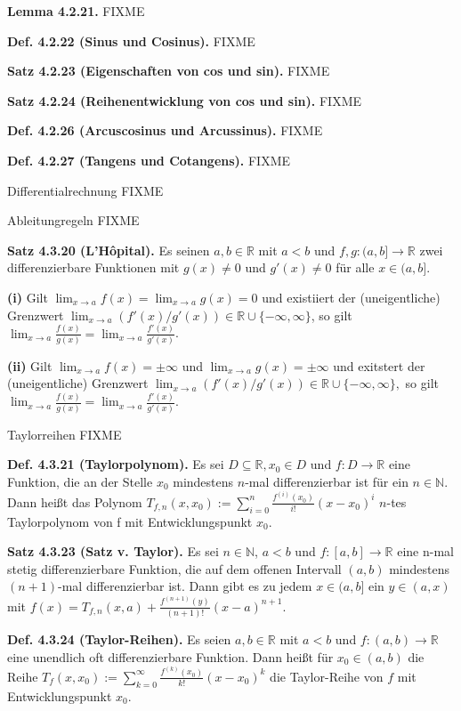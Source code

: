 \documentclass[ngerman]{article}
\begin{document}
\begin{multicols}{4}
\begin{tiny}
\textbf{Lemma 4.2.21.} FIXME

\textbf{Def. 4.2.22 (Sinus und Cosinus).} FIXME

\textbf{Satz 4.2.23 (Eigenschaften von cos und sin).} FIXME

\textbf{Satz 4.2.24 (Reihenentwicklung von cos und sin).} FIXME

\textbf{Def. 4.2.26 (Arcuscosinus und Arcussinus).} FIXME

\textbf{Def. 4.2.27 (Tangens und Cotangens).} FIXME

Differentialrechnung FIXME



Ableitungregeln FIXME



\textbf{Satz 4.3.20 (L'Hôpital).} Es seinen $a,b\in\mathbb{R}$ mit
$a<b$ und $f,g:(a,b]\rightarrow\mathbb{R}$ zwei differenzierbare
Funktionen mit $g(x)\not=0$ und $g'(x)\not=0$ für alle $x\in(a,b]$.

\textbf{(i)} Gilt $\lim_{x\rightarrow a}f(x)=\lim_{x\rightarrow a}g(x)=0$
und existiiert der (uneigentliche) Grenzwert $\lim_{x\rightarrow a}(f'(x)/g'(x))\in\mathbb{R}\cup\{-\infty,\infty\}$,
so gilt $\lim_{x\rightarrow a}\frac{f(x)}{g(x)}=\lim_{x\rightarrow a}\frac{f'(x)}{g'(x)}$.

\textbf{(ii) }Gilt $\lim_{x\rightarrow a}f(x)=\pm\infty$ und $\lim_{x\rightarrow a}g(x)=\pm\infty$
und exitstert der (uneigentliche) Grenzwert $\lim_{x\rightarrow a}(f'(x)/g'(x))\in\mathbb{R}\cup\{-\infty,\infty\},$
so gilt $\lim_{x\rightarrow a}\frac{f(x)}{g(x)}=\lim_{x\rightarrow a}\frac{f'(x)}{g'(x)}$.

Taylorreihen FIXME

\textbf{Def. 4.3.21 (Taylorpolynom).} Es sei $D\subseteq\mathbb{R},x_{0}\in D$
und $f:D\rightarrow\mathbb{R}$ eine Funktion, die an der Stelle $x_{0}$
mindestens $n$-mal differenzierbar ist für ein $n\in\mathbb{N}.$
Dann heißt das Polynom $T_{f,n}(x,x_{0}):=\sum_{i=0}^{n}\frac{f^{(i)}(x_{0})}{i!}(x-x_{0})^{i}$
$n$-tes Taylorpolynom von f mit Entwicklungspunkt $x_{0}$.

\textbf{Satz 4.3.23 (Satz v. Taylor).} Es sei $n\in\mathbb{N}$, $a<b$
und $f:[a,b]\rightarrow\mathbb{R}$ eine n-mal stetig differenzierbare
Funktion, die auf dem offenen Intervall $(a,b)$ mindestens $(n+1)$-mal
differenzierbar ist. Dann gibt es zu jedem $x\in(a,b]$ ein $y\in(a,x)$
mit $f(x)=T_{f,n}(x,a)+\frac{f^{(n+1)}(y)}{(n+1)!}(x-a)^{n+1}$.

\textbf{Def. 4.3.24 (Taylor-Reihen).} Es seien $a,b\in\mathbb{R}$
mit $a<b$ und $f:(a,b)\rightarrow\mathbb{R}$ eine unendlich oft
differenzierbare Funktion. Dann heißt für $x_{0}\in(a,b)$ die Reihe
$T_{f}(x,x_{0}):=\sum_{k=0}^{\infty}\frac{f^{(k)}(x_{0})}{k!}(x-x_{0})^{k}$
die Taylor-Reihe von $f$ mit Entwicklungspunkt $x_{0}$.


\end{tiny}
\end{multicols}
\end{document}
